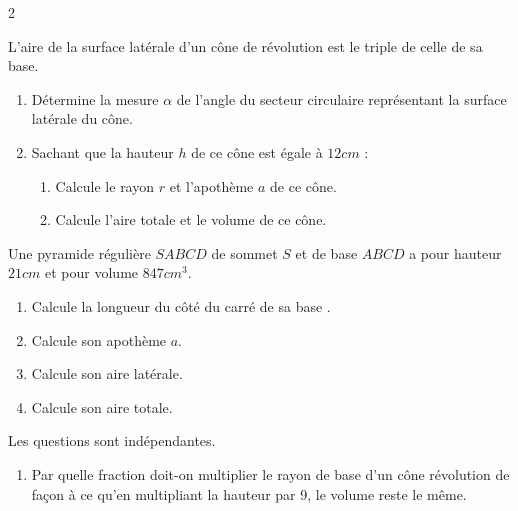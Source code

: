 \begin{multicols*}{2}
  	\reto
  	\begin{center}
  	\end{center}
  	\begin{center}
  	\end{center}
  	L'aire de la surface latérale d'un cône de révolution est le triple de celle de sa base.
  	\begin{enumerate}
  		\item Détermine la mesure $\alpha$  de l'angle  du secteur circulaire représentant la surface latérale du cône.
  		\item  Sachant que la hauteur $h$ de ce cône est égale à $12 cm$ :
  		\begin{enumerate}
  			\item  Calcule le rayon $r$ et l'apothème $a$ de ce cône.
  			\item  Calcule l'aire totale et le volume de ce cône.
  		\end{enumerate}
  	\end{enumerate}
  	\begin{center}
  	\end{center}
  	Une pyramide régulière $SABCD$ de sommet $S$  et de base $ABCD$ a pour hauteur $21 cm$  et pour volume $847 cm^{3}$.
  	\begin{enumerate}
  		\item  Calcule la longueur du côté du carré de sa base .
  		\item  Calcule son apothème $a$.
  		\item Calcule son aire latérale.
  		\item Calcule son aire totale.
  	\end{enumerate}
  	
  	\begin{center}
  	\end{center}
  	Les questions sont indépendantes.
  	\begin{enumerate}
  		\item  Par quelle fraction doit-on multiplier le rayon de base d'un cône révolution de façon à ce qu'en multipliant la hauteur par 9, le volume reste le même. 
  		

\end{enumerate}
\end{multicols*}
